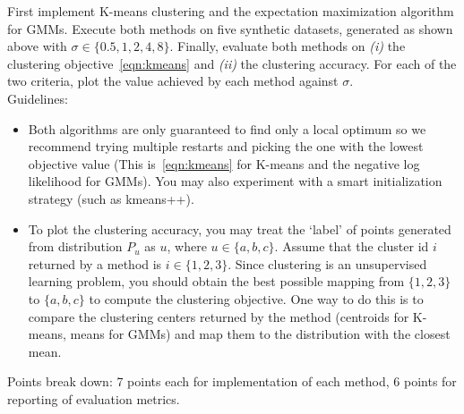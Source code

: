 \documentclass[a4paper]{article}
\newcounter{thm}
\theoremstyle{definition}
\begin{document}
First implement K-means clustering and the expectation maximization algorithm for GMMs.
Execute both methods on five synthetic datasets,
generated as shown above with $\sigma \in \{0.5, 1, 2, 4, 8\}$. Finally, evaluate both methods on \emph{(i)} the clustering objective~\eqref{eqn:kmeans} and \emph{(ii)}  the clustering accuracy. For each of the two criteria, plot the value achieved by each method against $\sigma$.\\


Guidelines:
\begin{itemize}
	\item Both algorithms are only guaranteed to find only a local optimum so we recommend trying multiple
	      restarts and picking the one with the lowest objective value (This is~\eqref{eqn:kmeans} for K-means and the negative log likelihood for GMMs).
	      You may also experiment with a smart initialization
	      strategy (such as kmeans++).

	\item
	      To plot the clustering accuracy,  you may treat the `label' of points generated from distribution
	      $P_u$ as $u$, where $u\in \{a, b, c\}$.
	      Assume that the cluster id $i$ returned by a method is $i\in \{1, 2, 3\}$.
	      Since clustering is an unsupervised learning problem, you should obtain the best possible mapping
	      from $\{1, 2, 3\}$ to $\{a, b, c\}$ to compute the clustering objective.
	      One way to do this is to compare the clustering centers returned by the method (centroids for
	      K-means, means for GMMs) and map them to the distribution with the closest mean.

\end{itemize}

Points break down: 7 points each for implementation of each method, 6 points for reporting of
evaluation metrics.
\end{document}
